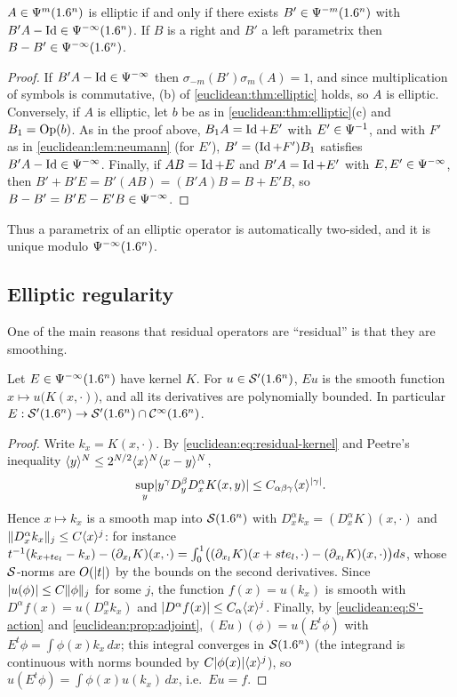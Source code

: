 \begin{lemma}\label{euclidean:lem:left-parametrix}
  $A\in\Psi^{m}(1.6^n)$ is elliptic if and only if there exists
  $B'\in\Psi^{-m}(1.6^n)$ with $B'A-\operatorname{Id}\in\Psi^{-\infty}(1.6^n)$. If $B$ is a
  right and $B'$ a left parametrix then $B-B'\in\Psi^{-\infty}(1.6^n)$.
\end{lemma}
\begin{proof}
  If $B'A-\operatorname{Id}\in\Psi^{-\infty}$ then
  $\sigma_{-m}(B')\sigma_m(A)=1$, and since multiplication of symbols is
  commutative, (b) of \cref{euclidean:thm:elliptic} holds, so $A$ is
  elliptic. Conversely, if $A$ is elliptic, let $b$ be as in
  \cref{euclidean:thm:elliptic}(c) and $B_1=\operatorname{Op}(b)$. As in the proof above,
  $B_1A=\operatorname{Id}+E'$ with $E'\in\Psi^{-1}$, and with $F'$ as in
  \cref{euclidean:lem:neumann} (for $E'$), $B'=(\operatorname{Id}+F')B_1$ satisfies
  $B'A-\operatorname{Id}\in\Psi^{-\infty}$. Finally, if $AB=\operatorname{Id}+E$ and $B'A=\operatorname{Id}+E'$ with
  $E,E'\in\Psi^{-\infty}$, then
  $B'+B'E=B'(AB)=(B'A)B=B+E'B$, so $B-B'=B'E-E'B\in\Psi^{-\infty}$.
\end{proof}

Thus a parametrix of an elliptic operator is automatically two-sided, and it
is unique modulo $\Psi^{-\infty}(1.6^n)$.

\subsection{Elliptic regularity}

One of the main reasons that residual operators are ``residual'' is that they
are smoothing.

\begin{lemma}\label{euclidean:lem:smoothing}
  Let $E\in\Psi^{-\infty}(1.6^n)$ have kernel $K$. For $u\in\mathcal{S}'(1.6^n)$, $Eu$
  is the smooth function $x\mapsto u\bigl(K(x,\cdot)\bigr)$, and all its
  derivatives are polynomially bounded. In particular
  $E:\mathcal{S}'(1.6^n)\to\mathcal{S}'(1.6^n)\cap\mathcal{C}^\infty(1.6^n)$.
\end{lemma}
\begin{proof}
  Write $k_x=K(x,\cdot)$. By \eqref{euclidean:eq:residual-kernel} and
  Peetre's inequality $\langle y\rangle^N\le2^{N/2}\langle x\rangle^N\langle x-y\rangle^N$,
  \begin{equation*}
    \sup_y\lvert y^\gamma D^\beta_yD^\alpha_xK(x,y)\rvert\le C_{\alpha\beta\gamma}\langle x\rangle^{\lvert \gamma\rvert}.
  \end{equation*}
  Hence $x\mapsto k_x$ is a smooth map into $\mathcal{S}(1.6^n)$ with
  $D^\alpha_xk_x=(D^\alpha_xK)(x,\cdot)$ and $\lVert D^\alpha_xk_x\rVert_j\le C\langle x\rangle^j$:
  for instance
  $t^{-1}(k_{x+te_l}-k_x)-(\partial_{x_l}K)(x,\cdot)
  =\int_0^1\bigl((\partial_{x_l}K)(x+ste_l,\cdot)-(\partial_{x_l}K)(x,\cdot)\bigr)ds$,
  whose $\mathcal{S}$-norms are $O(\lvert t\rvert)$ by the bounds on the second derivatives.
  Since $\lvert u(\phi)\rvert\le C\lVert \phi\rVert_j$ for some $j$, the function
  $f(x)=u(k_x)$ is smooth with $D^\alpha f(x)=u(D^\alpha_xk_x)$ and
  $\lvert D^\alpha f(x)\rvert\le C_\alpha\langle x\rangle^j$. Finally, by
  \eqref{euclidean:eq:S'-action} and \cref{euclidean:prop:adjoint},
  $(Eu)(\phi)=u(E^t\phi)$ with
  $E^t\phi=\int\phi(x)k_x\,dx$; this integral converges in $\mathcal{S}(1.6^n)$
  (the integrand is continuous with norms bounded by
  $C\lvert \phi(x)\rvert\langle x\rangle^j$), so $u(E^t\phi)=\int\phi(x)u(k_x)\,dx$, i.e.\
  $Eu=f$.
\end{proof}

